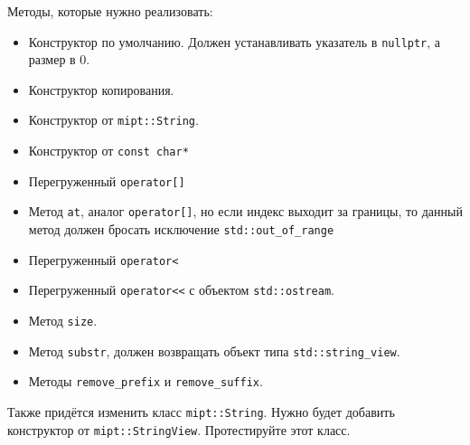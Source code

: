 \documentclass{article}
\begin{document}
Методы, которые нужно реализовать:
\begin{itemize}
\item Конструктор по умолчанию. Должен устанавливать указатель в \texttt{nullptr}, а размер в 0.
\item Конструктор копирования.
\item Конструктор от \texttt{mipt::String}.
\item Конструктор от \texttt{const char*}
\item Перегруженный \texttt{operator[]}
\item Метод \texttt{at}, аналог \texttt{operator[]}, но если индекс выходит за границы, то данный метод должен бросать исключение \texttt{std::out\_of\_range}
\item Перегруженный \texttt{operator<}
\item Перегруженный \texttt{operator<{}<} с объектом \texttt{std::ostream}.
\item Метод \texttt{size}.
\item Метод \texttt{substr}, должен возвращать объект типа \texttt{std::string\_view}.
\item Методы \texttt{remove\_prefix} и \texttt{remove\_suffix}.
\end{itemize}

Также придётся изменить класс \texttt{mipt::String}. Нужно будет добавить конструктор от \texttt{mipt::StringView}.
Протестируйте этот класс.
\end{document}
